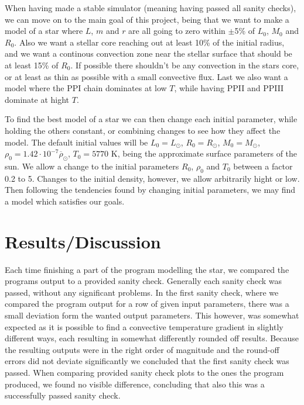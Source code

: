 \documentclass{emulateapj}
\begin{document}
	When having made a stable simulator (meaning having passed all sanity checks), we can move on to the main goal of this project, being that we want to make a model of a star where $L$, $m$ and $r$ are all going to zero within $\pm$5\% of $L_0$, $M_0$ and $R_0$. Also we want a stellar core reaching out at least 10\% of the initial radius, and we want a continous convection zone near the stellar surface that should be at least 15\% of $R_0$. If possible there shouldn't be any convection in the stars core, or at least as thin as possible with a small convective flux. Last we also want a model where the PPI chain dominates at low $T$, while having PPII and PPIII dominate at hight $T$. 
	
	To find the best model of a star we can then change each initial parameter, while holding the others constant, or combining changes to see how they affect the model. The default initial values will be $L_0 = L_\odot$, $R_0 = R_\odot$, $M_0 = M_\odot$, $\rho_0 = 1.42\cdot 10^{-7}\overline{\rho}_\odot$, $T_0 = 5770$ K, being the approximate surface parameters of the sun. We allow a change to the initial parameters $R_0$, $\rho_0$ and $T_0$ between a factor 0.2 to 5. Changes to the initial density, however, we allow arbitrarily hight or low. Then following the tendencies found by changing initial parameters, we may find a model which satisfies our goals. 
	
	\section*{Results/Discussion}
	Each time finishing a part of the program modelling the star, we compared the programs output to a provided sanity check. Generally each sanity check was passed, without any significant problems. In the first sanity check, where we compared the program output for a row of given input parameters, there was a small deviation form the wanted output parameters. This however, was somewhat expected as it is possible to find a convective temperature gradient in slightly different ways, each resulting in somewhat differently rounded off results. Because the resulting outputs were in the right order of magnitude and the round-off errors did not deviate significantly we concluded that the first sanity check was passed. When comparing provided sanity check plots to the ones the program produced, we found no visible difference, concluding that also this was a successfully passed sanity check.
	
\end{document}
